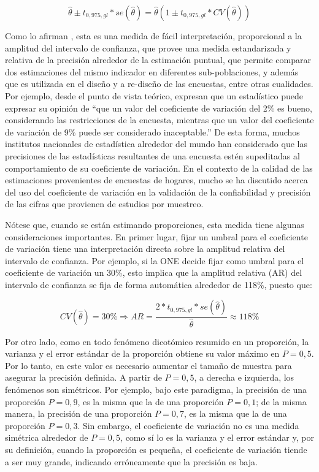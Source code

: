 \documentclass[
  12pt,
]{book}
\begin{document}
\[
\hat\theta \pm t_{0,975, gl} * se(\hat\theta) = \hat\theta  \left(1 \pm t_{0,975, gl} * CV(\hat\theta)\right)
\]

Como lo afirman \citet{Singh_Westlake_Feder_2004}, esta es una medida de fácil interpretación, proporcional a la amplitud del intervalo de confianza, que provee una medida estandarizada y relativa de la precisión alrededor de la estimación puntual, que permite comparar dos estimaciones del mismo indicador en diferentes sub-poblaciones, y además que es utilizada en el diseño y a re-diseño de las encuestas, entre otras cualidades. Por ejemplo, desde el punto de vista teórico, \citet{Sarndal_Swensson_Wretman_2003} expresan que un estadístico puede expresar su opinión de ``que un valor del coeficiente de variación del 2\% es bueno, considerando las restricciones de la encuesta, mientras que un valor del coeficiente de variación de 9\% puede ser considerado inaceptable.'' De esta forma, muchos institutos nacionales de estadística alrededor del mundo han considerado que las precisiones de las estadísticas resultantes de una encuesta estén supeditadas al comportamiento de su coeficiente de variación. En el contexto de la calidad de las estimaciones provenientes de encuestas de hogares, mucho se ha discutido acerca del uso del coeficiente de variación en la validación de la confiabilidad y precisión de las cifras que provienen de estudios por muestreo.

Nótese que, cuando se están estimando proporciones, esta medida tiene algunas consideraciones importantes. En primer lugar, fijar un umbral para el coeficiente de variación tiene una interpretación directa sobre la amplitud relativa del intervalo de confianza. Por ejemplo, si la ONE decide fijar como umbral para el coeficiente de variación un 30\%, esto implica que la amplitud relativa (AR) del intervalo de confianza se fija de forma automática alrededor de 118\%, puesto que:

\[
CV(\hat\theta) = 30\% 
\Rightarrow 
AR = \frac{2*t_{0,975, gl} * se(\hat\theta)}{\hat\theta} \approx 118\%
\]

Por otro lado, como en todo fenómeno dicotómico resumido en un proporción, la varianza y el error estándar de la proporción obtiene su valor máximo en \(P=0,5\). Por lo tanto, en este valor es necesario aumentar el tamaño de muestra para asegurar la precisión definida. A partir de \(P=0,5\), a derecha e izquierda, los fenómenos son simétricos. Por ejemplo, bajo este paradigma, la precisión de una proporción \(P=0,9\), es la misma que la de una proporción \(P=0,1\); de la misma manera, la precisión de una proporción \(P=0,7\), es la misma que la de una proporción \(P=0,3\). Sin embargo, el coeficiente de variación no es una medida simétrica alrededor de \(P=0,5\), como sí lo es la varianza y el error estándar y, por su definición, cuando la proporción es pequeña, el coeficiente de variación tiende a ser muy grande, indicando erróneamente que la precisión es baja.
\end{document}
